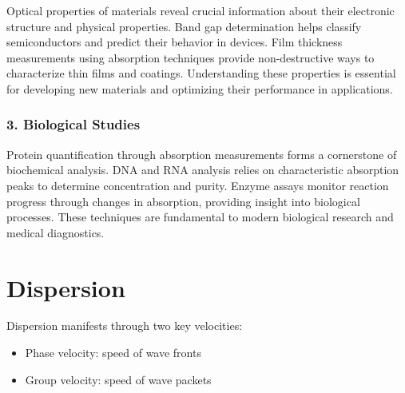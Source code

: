 \documentclass[
  a4paper,
]{book}
\providecommand{\tightlist}{%
  \setlength{\itemsep}{0pt}\setlength{\parskip}{0pt}}
\begin{document}
\begin{tcolorbox}
Optical properties of materials reveal crucial information about their
electronic structure and physical properties. Band gap determination
helps classify semiconductors and predict their behavior in devices.
Film thickness measurements using absorption techniques provide
non-destructive ways to characterize thin films and coatings.
Understanding these properties is essential for developing new materials
and optimizing their performance in applications.

\subsubsection{3. Biological Studies}\label{biological-studies}

Protein quantification through absorption measurements forms a
cornerstone of biochemical analysis. DNA and RNA analysis relies on
characteristic absorption peaks to determine concentration and purity.
Enzyme assays monitor reaction progress through changes in absorption,
providing insight into biological processes. These techniques are
fundamental to modern biological research and medical diagnostics.

\end{tcolorbox}

\section{Dispersion}\label{dispersion-1}

\begin{tcolorbox}[enhanced jigsaw, coltitle=black, title=\textcolor{quarto-callout-note-color}{\faInfo}\hspace{0.5em}{Note}, colframe=quarto-callout-note-color-frame, toprule=.15mm, opacitybacktitle=0.6, left=2mm, opacityback=0, breakable, toptitle=1mm, bottomtitle=1mm, leftrule=.75mm, arc=.35mm, titlerule=0mm, colbacktitle=quarto-callout-note-color!10!white, rightrule=.15mm, bottomrule=.15mm, colback=white]

Dispersion manifests through two key velocities:

\begin{itemize}
\tightlist
\item
  Phase velocity: speed of wave fronts
\item
  Group velocity: speed of wave packets
\end{itemize}

\end{tcolorbox}
\end{document}
